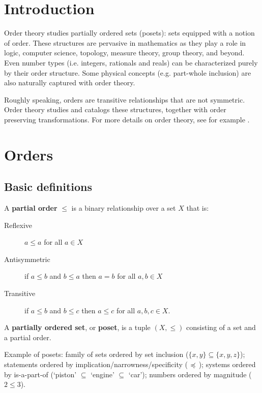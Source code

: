 \documentclass{bareminimum}
\begin{document}
\maketitle

\section{Introduction}

Order theory studies partially ordered sets (posets): sets equipped with a notion of order. These structures are pervasive in mathematics as they play a role in logic, computer science, topology, measure theory, group theory, and beyond. Even number types (i.e. integers, rationals and reals) can be characterized purely by their order structure. Some physical concepts (e.g. part-whole inclusion) are also naturally captured with order theory.

Roughly speaking, orders are transitive relationships that are not symmetric. Order theory studies and catalogs these structures, together with order preserving transformations. For more details on order theory, see for example \cite{davey2002introduction, pinter2014book}.

\section{Orders}

\subsection{Basic definitions}

\begin{defn}
	A \textbf{partial order}  $\leq$ is a binary relationship over a set $X$ that is:
	\begin{description}
		\item[Reflexive] $a \leq a$ for all $a \in X$
		\item[Antisymmetric] if $a \leq b$ and $b \leq a$ then $a = b$ for all $a, b \in X$
		\item[Transitive] if $a \leq b$ and $b \leq c$ then $a \leq c$ for all $a, b, c \in X$.
	\end{description}
	A \textbf{partially ordered set}, or \textbf{poset}, is a tuple $(X, \leq)$ consisting of a set and a partial order.
\end{defn}

Example of posets: family of sets ordered by set inclusion ($\{x, y\} \subseteq \{x, y, z\}$); statements ordered by implication/narrowness/specificity ( $\preccurlyeq$ ); systems ordered by is-a-part-of (`piston' $\subseteq$ `engine' $\subseteq$ `car'); numbers ordered by magnitude ($2 \leq 3$).
\end{document}
